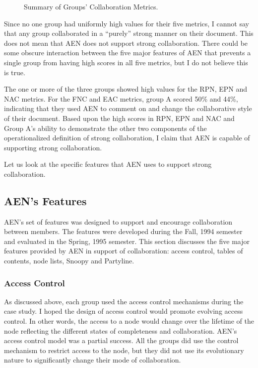 \begin{figure}[htbp]
  \centerline{}
 \caption{Summary of Groups' Collaboration Metrics.}
 \label{fig:op-def}
\end{figure}

Since no one group had uniformly high values for their five metrics, I
cannot say that any group collaborated in a ``purely'' strong manner on their
document.  This does not mean that AEN does not support strong
collaboration. There could be some obscure interaction between the five
major features of AEN that prevents a single group from having high scores
in all five metrics, but I do not believe this is true.

The one or more of the three groups showed high values for the RPN, EPN and
NAC metrics.  For the FNC and EAC metrics, group A scored 50\% and 44\%,
indicating that they used AEN to comment on and change the collaborative
style of their document.  Based upon the high scores in RPN, EPN and NAC
and Group A's ability to demonstrate the other two components of the
operationalized definition of strong collaboration, I claim that AEN is
capable of supporting strong collaboration.

Let us look at the specific features that AEN uses to support strong
collaboration.

\subsection{AEN's Features}
\label{sec:Tools}

AEN's set of features was designed to support and encourage collaboration
between members.  The features were developed during the Fall, 1994 semester
and evaluated in the Spring, 1995 semester.  This section discusses the
five major features provided by AEN in support of collaboration: access
control, tables of contents, node lists, Snoopy and Partyline.


\subsubsection{Access Control}

As discussed above, each group used the access control mechanisms during
the case study.  I hoped the design of access control would promote
evolving access control.  In other words, the access to a node would change
over the lifetime of the node reflecting the different states of
completeness and collaboration.  AEN's access control model was a partial
success.  All the groups did use the control mechanism to restrict access
to the node, but they did not use its evolutionary nature to significantly
change their mode of collaboration.


